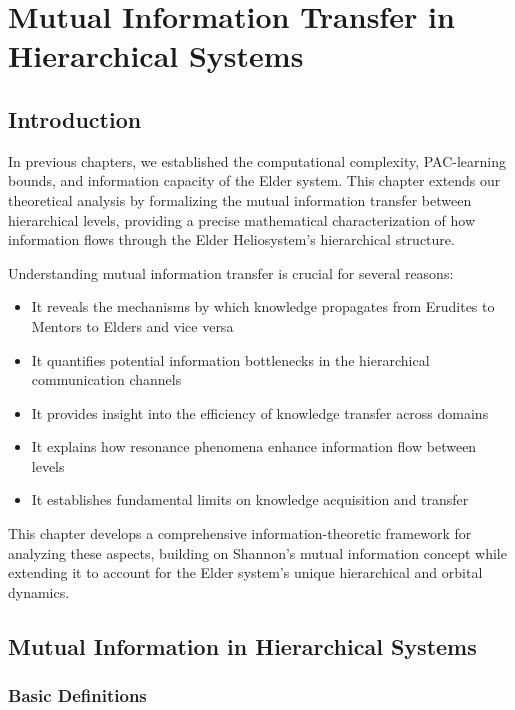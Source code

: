 \chapter{Mutual Information Transfer in Hierarchical Systems}

\section{Introduction}

In previous chapters, we established the computational complexity, PAC-learning bounds, and information capacity of the Elder system. This chapter extends our theoretical analysis by formalizing the mutual information transfer between hierarchical levels, providing a precise mathematical characterization of how information flows through the Elder Heliosystem's hierarchical structure.

Understanding mutual information transfer is crucial for several reasons:

\begin{itemize}
    \item It reveals the mechanisms by which knowledge propagates from Erudites to Mentors to Elders and vice versa
    \item It quantifies potential information bottlenecks in the hierarchical communication channels
    \item It provides insight into the efficiency of knowledge transfer across domains
    \item It explains how resonance phenomena enhance information flow between levels
    \item It establishes fundamental limits on knowledge acquisition and transfer
\end{itemize}

This chapter develops a comprehensive information-theoretic framework for analyzing these aspects, building on Shannon's mutual information concept while extending it to account for the Elder system's unique hierarchical and orbital dynamics.

\section{Mutual Information in Hierarchical Systems}



\subsection{Basic Definitions}

